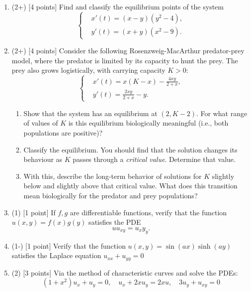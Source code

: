 \documentclass[12pt]{article}
\begin{document}
\begin{enumerate}
   \item (2+) [4 points] Find and classify the equilibrium points of the system
         \[
            \left\lbrace
            \begin{aligned}
                & x'(t)=(x-y)(y^2-4), \\
                & y'(t)=(x+y)(x^2-9).
            \end{aligned}
            \right.
         \]
         \vfill
         \newpage
   \item (2+) [4 points] Consider the following Rosenzweig-MacArthur predator-prey model, where the predator is limited by its capacity to hunt the prey. The prey also grows logistically, with carrying capacity \(K > 0\):
         \[
            \left\lbrace
            \begin{aligned}
                & x'(t)=x(K-x) - \frac{4xy}{2+x}, \\
                & y'(t)=\frac{2xy}{2+x} - y.
            \end{aligned}
            \right.
         \]
         \begin{enumerate}
            \item Show that the system has an equilibrium at \((2,K-2)\). For what range of values of \(K\) is this equilibrium biologically meaningful (i.e., both populations are positive)?
            \item Classify the equilibrium. You should find that the solution changes its behaviour as \(K\) passes through a \emph{critical value}. Determine that value.
            \item With this, describe the long-term behavior of solutions for \(K\) slightly below and slightly above that critical value. What does this transition mean biologically for the predator and prey populations?
         \end{enumerate}

   \item (1) [1 point] If \(f,g\) are differentiable functions, verify that the function \(u(x,y)=f(x)g(y)\) satisfies the PDE
         \[
            uu_{xy}=u_xy_y.
         \]

   \item (1-) [1 point] Verify that the function \(u(x,y)=\sin(ax)\sinh(ay)\) satisfies the Laplace equation \(u_{xx}+u_{yy}=0\)

   \item (2) [3 points] Via the method of characteristic curves and solve the PDEs:
         \[
            (1+x^2)u_x+u_y=0,\quad u_x+2xu_y=2xu,\quad 3u_y+u_{xy}=0
         \]


\end{enumerate}
\end{document}
